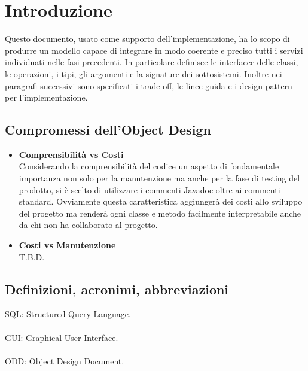 \chapter{Introduzione}

Questo documento, usato come supporto dell’implementazione, ha lo scopo di produrre un modello capace di integrare in modo coerente e preciso tutti i servizi individuati nelle fasi precedenti. In particolare definisce le interfacce delle classi, le operazioni, i tipi, gli argomenti e la signature dei sottosistemi. Inoltre nei paragrafi successivi sono specificati i trade-off, le linee guida e i design pattern per l’implementazione.

\section{Compromessi dell'Object Design}
\begin{itemize}
  \item \textbf{Comprensibilità vs Costi}\\
  Considerando la comprensibilità del codice un aspetto di fondamentale importanza non solo per la manutenzione ma anche per la fase di testing del prodotto, si è scelto di utilizzare i commenti Javadoc oltre ai commenti standard. Ovviamente questa caratteristica aggiungerà dei costi allo sviluppo del progetto ma renderà ogni classe e metodo facilmente interpretabile anche da chi non ha collaborato al progetto.
  \item \textbf{Costi vs Manutenzione}\\
  T.B.D.
\end{itemize}

\section{Definizioni, acronimi, abbreviazioni}

\textsc{SQL}: Structured Query Language. \\ \\
\textsc{GUI}: Graphical User Interface. \\ \\
\textsc{ODD}: Object Design Document. \\ \\